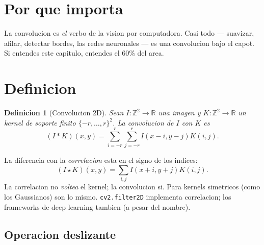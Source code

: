\documentclass[11pt,a4paper,twoside,openright]{book}
\newtheorem{definicion}{Definicion}[chapter]
\begin{document}
\section{Por que importa}

La convolucion es \emph{el} verbo de la vision por computadora. Casi todo --- suavizar, afilar, detectar bordes, las redes neuronales --- es una convolucion bajo el capot. Si entendes este capitulo, entendes el 60\% del area.

\section{Definicion}

\begin{definicion}[Convolucion 2D]
Sean $I: \mathbb{Z}^2 \to \mathbb{R}$ una imagen y $K: \mathbb{Z}^2 \to \mathbb{R}$ un \emph{kernel} de soporte finito $\{-r,\dots,r\}^2$. La \emph{convolucion} de $I$ con $K$ es
\begin{equation}
(I * K)(x,y) = \sum_{i=-r}^{r} \sum_{j=-r}^{r} I(x-i, y-j) K(i,j).
\label{eq:conv2d}
\end{equation}
\end{definicion}

La diferencia con la \emph{correlacion} esta en el signo de los indices:
\begin{equation}
(I \star K)(x,y) = \sum_{i,j} I(x+i, y+j) K(i,j).
\end{equation}
La correlacion no \emph{voltea} el kernel; la convolucion si. Para kernels simetricos (como los Gaussianos) son lo mismo. \texttt{cv2.filter2D} implementa correlacion; los frameworks de deep learning tambien (a pesar del nombre).

\subsection{Operacion deslizante}

\begin{center}
\end{center}
\end{document}
